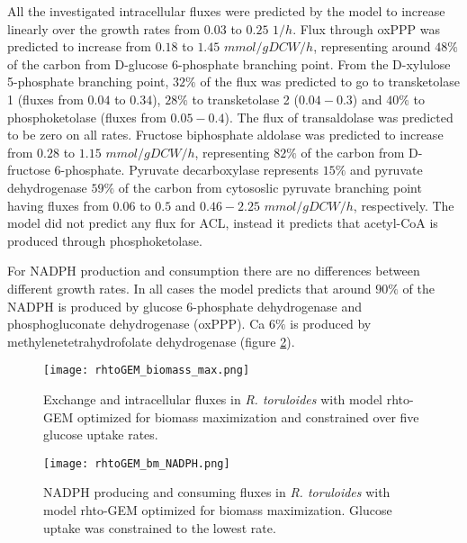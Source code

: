 

All the investigated intracellular fluxes were predicted by the model to increase linearly over the growth rates from $0.03$ to $0.25$ $1/h$.
Flux through oxPPP was predicted to increase from $0.18$ to $1.45$ $mmol/gDCW/h$, representing around $48\%$ of the carbon from 
D-glucose 6-phosphate branching point. From the D-xylulose 5-phosphate branching point, $32\%$ of the flux was 
predicted to go to transketolase 1 (fluxes from $0.04$ to $0.34$), $28\%$ to 
transketolase 2 ($0.04-0.3$) and $40\%$ to phosphoketolase (fluxes from $0.05-0.4$). 
The flux of transaldolase was predicted to be zero on all rates. Fructose biphosphate aldolase was predicted to increase from 
$0.28$ to $1.15$ $mmol/gDCW/h$, representing $82\%$ of the carbon from D-fructose 6-phosphate. 
Pyruvate decarboxylase represents $15\%$ and pyruvate dehydrogenase $59\%$ of the carbon from %
cytososlic pyruvate branching point having fluxes from $0.06$ to $0.5$ and $0.46-2.25$ $mmol/gDCW/h$, respectively.
The model did not predict any flux for ACL, instead it predicts that acetyl-CoA is produced through phosphoketolase. %

For NADPH production and consumption there are no differences 
between different growth rates. In all cases the model predicts that around $90\%$ of the NADPH is produced by glucose 6-phosphate dehydrogenase and
phosphogluconate dehydrogenase (oxPPP). Ca $6\%$ is produced by methylenetetrahydrofolate dehydrogenase (figure \ref{fig:rhtoGEM_bm_NADPH}).
\begin{figure}[H]
    \centering
    \texttt{[image: rhtoGEM\_biomass\_max.png]}
    \caption{Exchange and intracellular fluxes in \textit{R. toruloides} with model rhto-GEM optimized for biomass maximization 
    and constrained over five glucose uptake rates.}
    \label{rhto-GEM biomass max}
\end{figure}
\begin{figure}[H]
    \centering
    \texttt{[image: rhtoGEM\_bm\_NADPH.png]}
    \caption{NADPH producing and consuming fluxes in \textit{R. toruloides} with model rhto-GEM optimized for biomass maximization. Glucose uptake was constrained 
    to the lowest rate.}
    \label{fig:rhtoGEM_bm_NADPH}
\end{figure}



